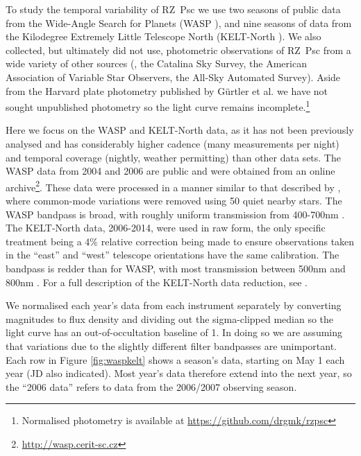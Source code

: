 \documentclass[]{rsos}
\begin{document}
To study the temporal variability of RZ~Psc we use two seasons of public data from the
Wide-Angle Search for Planets (WASP \cite{2006PASP..118.1407P,2010A&A...520L..10B}), and
nine seasons of data from the Kilodegree Extremely Little Telescope North (KELT-North
\cite{2007PASP..119..923P}). We also collected, but ultimately did not use, photometric
observations of RZ~Psc from a wide variety of other sources
(\cite{1994AJ....108.1906H,1973IBVS..783....1K,1980PZ.....21..310K,1985PZ.....22..181Z,1991Afz....34..333K,1997AcA....47..467P,2014Ap.....57..491P},
the Catalina Sky Survey, the American Association of Variable Star Observers, the All-Sky
Automated Survey). Aside from the Harvard plate photometry published by G\"urtler et
al. \cite{1999A&AS..140..293G} we have not sought unpublished photometry so the light
curve remains incomplete.\footnote{Normalised photometry is available at
  \href{https://github.com/drgmk/rzpsc}{https://github.com/drgmk/rzpsc}}

Here we focus on the WASP and KELT-North data, as it has not been previously analysed and
has considerably higher cadence (many measurements per night) and temporal coverage
(nightly, weather permitting) than other data sets. The WASP data from 2004 and 2006 are
public and were obtained from an online
archive\footnote{\href{http://wasp.cerit-sc.cz}{http://wasp.cerit-sc.cz}}. These data
were processed in a manner similar to that described by \cite{2014MNRAS.441.2845V}, where
common-mode variations were removed using 50 quiet nearby stars. The WASP bandpass is
broad, with roughly uniform transmission from 400-700nm \cite{2006PASP..118.1407P}. The
KELT-North data, 2006-2014, were used in raw form, the only specific treatment being a
4\% relative correction being made to ensure observations taken in the ``east'' and
``west'' telescope orientations have the same calibration. The bandpass is redder than
for WASP, with most transmission between 500nm and 800nm \cite{2007PASP..119..923P}.  For
a full description of the KELT-North data reduction, see \cite{2012ApJ...761..123S}.

We normalised each year's data from each instrument separately by converting magnitudes
to flux density and dividing out the sigma-clipped median so the light curve has an
out-of-occultation baseline of 1. In doing so we are assuming that variations due to the
slightly different filter bandpasses are unimportant. Each row in Figure
\ref{fig:waspkelt} shows a season's data, starting on May 1 each year (JD also
indicated). Most year's data therefore extend into the next year, so the ``2006 data''
refers to data from the 2006/2007 observing season.
\end{document}
